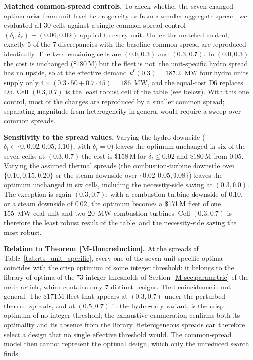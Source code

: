 \documentclass[11pt]{article}
\begin{document}
\textbf{Matched common-spread controls.} To check whether the seven changed optima arise from unit-level heterogeneity or from a smaller aggregate spread, we evaluated all 30 cells against a single common-spread control $(\delta_l, \delta_r) = (0.06, 0.02)$ applied to every unit.
Under the matched control, exactly 5 of the 7 discrepancies with the baseline common spread are reproduced identically. The two remaining cells are $(0.0, 0.3)$ and $(0.3, 0.7)$. In $(0.0, 0.3)$ the cost is unchanged (\$180\,M) but the fleet is not: the unit-specific hydro spread has no upside, so at the effective demand $k^0(0.3) = 187.2$~MW four hydro units supply only $4 \times (0.3 \cdot 50 + 0.7 \cdot 45) = 186$~MW, and the equal-cost D6 replaces D5. Cell $(0.3, 0.7)$ is the least robust cell of the table (see below). With this one control, most of the changes are reproduced by a smaller common spread; separating magnitude from heterogeneity in general would require a sweep over common spreads.

\textbf{Sensitivity to the spread values.} Varying the hydro downside ($\delta_l \in \{0, 0.02, 0.05, 0.10\}$, with $\delta_r = 0$) leaves the optimum unchanged in six of the seven cells; at $(0.3, 0.7)$ the cost is \$158\,M for $\delta_l \le 0.02$ and \$180\,M from $0.05$. Varying the assumed thermal spreads (the combustion-turbine downside over $\{0.10, 0.15, 0.20\}$ or the steam downside over $\{0.02, 0.05, 0.08\}$) leaves the optimum unchanged in six cells, including the necessity-side saving at $(0.3, 0.0)$. The exception is again $(0.3, 0.7)$: with a combustion-turbine downside of $0.10$, or a steam downside of $0.02$, the optimum becomes a \$171\,M fleet of one 155~MW coal unit and two 20~MW combustion turbines. Cell $(0.3, 0.7)$ is therefore the least robust result of the table, and the necessity-side saving the most robust.

\textbf{Relation to Theorem~\ref*{M-thm:reduction}.} At the spreads of Table~\ref{tab:rts_unit_specific}, every one of the seven unit-specific optima coincides with the crisp optimum of some integer threshold: it belongs to the library of optima of the $73$ integer thresholds of Section~\ref*{M-sec:parametric} of the main article, which contains only $7$ distinct designs. That coincidence is not general. The \$171\,M fleet that appears at $(0.3, 0.7)$ under the perturbed thermal spreads, and at $(0.5, 0.7)$ in the hydro-only variant, is the crisp optimum of no integer threshold; the exhaustive enumeration confirms both its optimality and its absence from the library. Heterogeneous spreads can therefore select a design that no single effective threshold would. The common-spread model then cannot represent the optimal design, which only the unreduced search finds.
\end{document}
